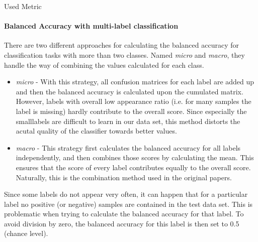 \begin{subsection}{Used Metric}
		\paragraph{Balanced Accuracy with multi-label classification}
		There are two different approaches for calculating the balanced accuracy for classification tasks with more than two classes. Named \emph{micro} and \emph{macro}, they handle the way of combining the values calculated for each class.
		\begin{itemize}
			\item \emph{micro} - With this strategy, all confusion matrices for each label are added up and then the balanced accuracy is calculated upon the cumulated matrix. However, labels with overall low appearance ratio (i.e. for many samples the label is missing) hardly contribute to the overall score. Since especially the \glqq small\grqq labels are difficult to learn in our data set, this method distorts the acutal quality of the classifier towards better values.
			\item \emph{macro} - This strategy first calculates the balanced accuracy for all labels independently, and then combines those scores by calculating the mean. This ensures that the score of every label contributes equally to the overall score. Naturally, this is the combination method used in the original papers.
		\end{itemize}
		Since some labels do not appear very often, it can happen that for a particular label no positive (or negative) samples are contained in the test data set. This is problematic when trying to calculate the balanced accuracy for that label. To avoid division by zero, the balanced accuracy for this label is then set to 0.5 (chance level).
		

	\end{subsection}